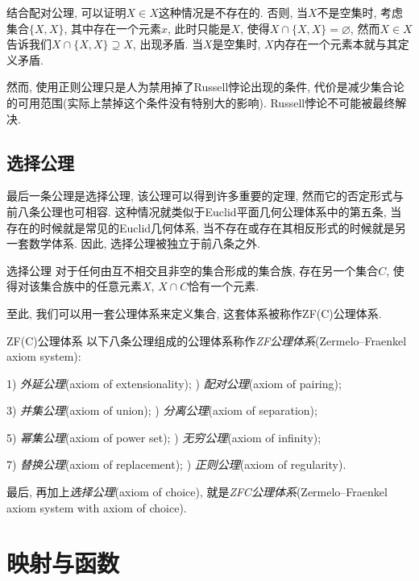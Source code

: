 结合配对公理, 可以证明$X \in X$这种情况是不存在的. 否则, 当$X$不是空集时, 考虑集合$\{ X, X \}$, 其中存在一个元素$x$, 此时只能是$X$, 使得$X \cap \{ X, X \}=\varnothing$, 然而$X \in X$告诉我们$X \cap \{ X, X \} \supseteq X$, 出现矛盾. 当$X$是空集时, $X$内存在一个元素本就与其定义矛盾.

然而, 使用正则公理只是人为禁用掉了Russell悖论出现的条件, 代价是减少集合论的可用范围(实际上禁掉这个条件没有特别大的影响). Russell悖论不可能被最终解决.

\subsection{选择公理}

最后一条公理是选择公理, 该公理可以得到许多重要的定理, 然而它的否定形式与前八条公理也可相容. 这种情况就类似于Euclid平面几何公理体系中的第五条, 当存在的时候就是常见的Euclid几何体系, 当不存在或存在其相反形式的时候就是另一套数学体系. 因此, 选择公理被独立于前八条之外. 

\begin{axiom}{选择公理}
	对于任何由互不相交且非空的集合形成的集合族, 存在另一个集合$C$, 使得对该集合族中的任意元素$X$, $X \cap C$恰有一个元素.
\end{axiom}

至此, 我们可以用一套公理体系来定义集合, 这套体系被称作ZF(C)公理体系.

\begin{definition}{ZF(C)公理体系}
	以下八条公理组成的公理体系称作\textit{ZF公理体系}(Zermelo–Fraenkel axiom system): 
	
	1) \textit{外延公理}(axiom of extensionality); ) \textit{配对公理}(axiom of pairing); 
	
	3) \textit{并集公理}(axiom of union); ) \textit{分离公理}(axiom of separation);
	
	5) \textit{幂集公理}(axiom of power set); ) \textit{无穷公理}(axiom of infinity); 
	
	7) \textit{替换公理}(axiom of replacement); ) \textit{正则公理}(axiom of regularity). 

	最后, 再加上\textit{选择公理}(axiom of choice), 就是\textit{ZFC公理体系}(Zermelo–Fraenkel axiom system with axiom of choice).
\end{definition}

\newpage
\section{映射与函数}

